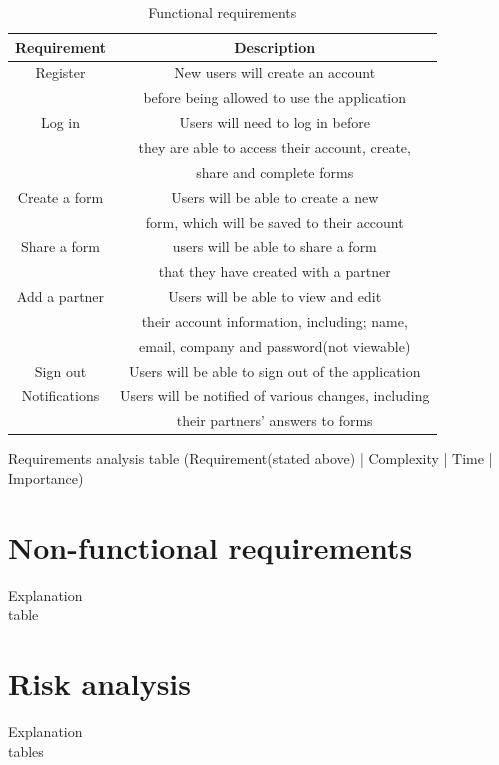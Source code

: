 \begin{table}
    \centering
    \begin{tabular}{|c|c|}
        \hline
        Requirement & Description\\
        \hline
        \hline
        Register & New users will create an account\\ & before being allowed to use the application\\
        \hline
        Log in & Users will need to log in before\\ & they are able to access their account, create,\\ & share and complete forms\\
        \hline
        Create a form & Users will be able to create a new\\ & form, which will be saved to their account\\
        \hline
        Share a form & users will be able to share a form\\ & that they have created with a partner\\
        \hline
        Add a partner & Users will be able to view and edit\\ & their account information, including; name,\\ & email, company and password(not viewable)\\
        \hline
        Sign out & Users will be able to sign out of the application\\
        \hline
        Notifications & Users will be notified of various changes, including\\ & their partners' answers to forms\\
        \hline
    \end{tabular}
    \caption{Functional requirements}
    \label{tab:my_label}
\end{table}

Requirements analysis table (Requirement(stated above) | Complexity | Time | Importance)

\section{Non-functional requirements}
Explanation\\table

\section{Risk analysis}
Explanation\\tables



